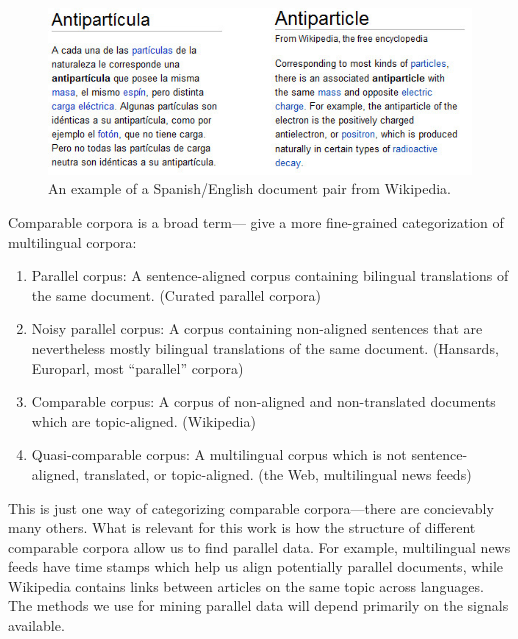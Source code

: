 \begin{figure}[ht]
\includegraphics[width=\textwidth]{images/wiki.jpg}
\caption{An example of a Spanish/English document pair from Wikipedia.}
\label{fig:wiki}
\end{figure}

Comparable corpora is a broad term---\citet{Fung04a} give a more
fine-grained categorization of multilingual corpora:
\begin{enumerate}
\item Parallel corpus: A sentence-aligned corpus containing bilingual
translations of the same document. (Curated parallel corpora)
\item Noisy parallel corpus: A corpus containing non-aligned sentences that are
nevertheless mostly bilingual translations of the same document. (Hansards,
Europarl, most ``parallel'' corpora)
\item Comparable corpus: A corpus of non-aligned and non-translated documents
which are topic-aligned. (Wikipedia)
\item Quasi-comparable corpus: A multilingual corpus which is not
sentence-aligned, translated, or topic-aligned. (the Web, multilingual news feeds)
\end{enumerate}
This is just one way of categorizing comparable corpora---there are concievably
many others. What is relevant for this work is how the structure of different
comparable corpora allow us to find parallel data. For example, multilingual news feeds have
time stamps which help us align potentially parallel documents, while Wikipedia
contains links between articles on the same topic across languages. The methods
we use for mining parallel data will depend primarily on the signals available.

